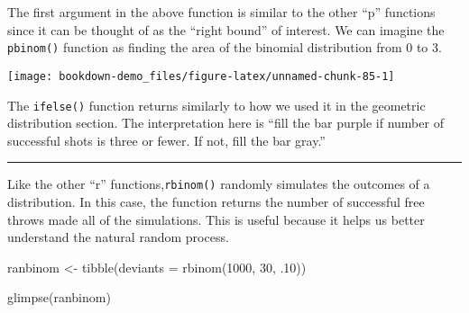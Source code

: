 \documentclass[
]{book}
\newenvironment{Shaded}{\begin{snugshade}}{\end{snugshade}}
\newcommand{\AttributeTok}[1]{\textcolor[rgb]{0.77,0.63,0.00}{#1}}
\newcommand{\DecValTok}[1]{\textcolor[rgb]{0.00,0.00,0.81}{#1}}
\newcommand{\FunctionTok}[1]{\textcolor[rgb]{0.00,0.00,0.00}{#1}}
\newcommand{\NormalTok}[1]{#1}
\newcommand{\OtherTok}[1]{\textcolor[rgb]{0.56,0.35,0.01}{#1}}
\newcommand{\SpecialCharTok}[1]{\textcolor[rgb]{0.00,0.00,0.00}{#1}}
\newcommand{\StringTok}[1]{\textcolor[rgb]{0.31,0.60,0.02}{#1}}
\begin{document}
The first argument in the above function is similar to the other ``p'' functions since it can be thought of as the ``right bound'' of interest. We can imagine the \texttt{pbinom()} function as finding the area of the binomial distribution from 0 to 3.

\begin{Shaded}
\end{Shaded}

\begin{center}\texttt{[image: bookdown-demo\_files/figure-latex/unnamed-chunk-85-1]} \end{center}

The \texttt{ifelse()} function returns similarly to how we used it in the geometric distribution section. The interpretation here is ``fill the bar purple if number of successful shots is three or fewer. If not, fill the bar gray.''

\begin{center}\rule{0.5\linewidth}{0.5pt}\end{center}

Like the other ``r'' functions,\texttt{rbinom()} randomly simulates the outcomes of a distribution. In this case, the function returns the number of successful free throws made all of the simulations. This is useful because it helps us better understand the natural random process.

\begin{Shaded}
\begin{Highlighting}[]
\NormalTok{ranbinom }\OtherTok{\textless{}{-}} \FunctionTok{tibble}\NormalTok{(}\AttributeTok{deviants =} \FunctionTok{rbinom}\NormalTok{(}\DecValTok{1000}\NormalTok{, }\DecValTok{30}\NormalTok{, .}\DecValTok{10}\NormalTok{))}

\FunctionTok{glimpse}\NormalTok{(ranbinom)}
\end{Highlighting}
\end{Shaded}
\end{document}
